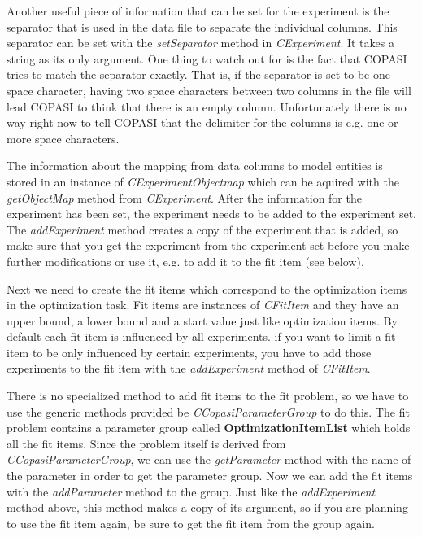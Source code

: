\documentclass[a4,10pt]{article}
\begin{document}
Another useful piece of information that can be set for the experiment is the separator that is used in the data file to separate the individual columns. This separator can be set with the \textit{setSeparator} method in \textit{CExperiment}. It takes a string as its only argument. One thing to watch out for is the fact that COPASI tries to match the separator exactly. That is, if the separator is set to be one space character, having two space characters between two columns in the file will lead COPASI to think that there is an empty column. Unfortunately there is no way right now to tell COPASI that the delimiter for the columns is e.g. one or more space characters.

The information about the mapping from data columns to model entities is stored in an instance of \textit{CExperimentObjectmap} which can be aquired with the \textit{getObjectMap} method from \textit{CExperiment}.
After the information for the experiment has been set, the experiment needs to be added to the experiment set. The \textit{addExperiment} method creates a copy of the experiment that is added, so make sure that you get the experiment from the experiment set before you make further modifications or use it, e.g. to add it to the fit item (see below).

Next we need to create the fit items which correspond to the optimization items in the optimization task. Fit items are instances of \textit{CFitItem} and they have an upper bound, a lower bound and a start value just like optimization items.
By default each fit item is influenced by all experiments. if you want to limit a fit item to be only influenced by certain experiments, you have to add those experiments to the fit item with the \textit{addExperiment} method of \textit{CFitItem}.

There is no specialized method to add fit items to the fit problem, so we have to use the generic methods provided be \textit{CCopasiParameterGroup} to do this. The fit problem contains a parameter group called \textbf{OptimizationItemList} which holds all the fit items. Since the problem itself is derived from \textit{CCopasiParameterGroup}, we can use the \textit{getParameter} method with the name of the parameter in order to get the parameter group. Now we can add the fit items with the \textit{addParameter} method to the group.
Just like the \textit{addExperiment} method above, this method makes a copy of its argument, so if you are planning to use the fit item again, be sure to get the fit item from the group again.
\end{document}
